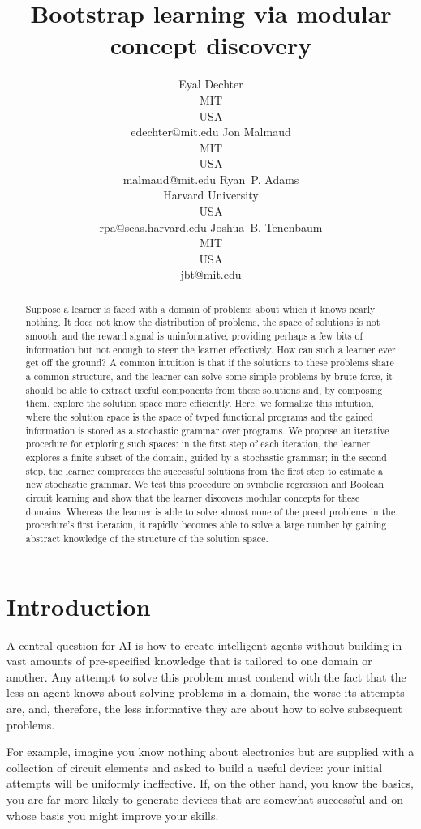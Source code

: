 \documentclass{article}
\title{Bootstrap learning via modular concept discovery}
\author{Eyal Dechter \\
MIT\\
USA \\
edechter@mit.edu
\And
Jon Malmaud \\
MIT \\ 
USA \\
malmaud@mit.edu
\And 
Ryan~P.  Adams \\
Harvard University\\
USA \\
rpa@seas.harvard.edu
\And
Joshua~B. Tenenbaum \\
MIT\\
USA \\
jbt@mit.edu
}
\begin{document}
\maketitle
\begin{abstract}
 Suppose a learner is faced with a domain of problems about which it
 knows nearly nothing. It does not know the distribution of problems,
 the space of solutions is not smooth, and the reward signal is
 uninformative, providing perhaps a few bits of information but not
 enough to steer the learner effectively. How can such a learner ever
 get off the ground? A common intuition is that if the solutions to
 these problems share a common structure, and the learner can solve
 some simple problems by brute force, it should be able to extract
 useful components from these solutions and, by composing them,
 explore the solution space more efficiently. Here, we formalize this
 intuition, where the solution space is the space of typed functional
 programs and the gained information is stored as a stochastic grammar
 over programs. We propose an iterative procedure for exploring such
 spaces: in the first step of each iteration, the learner explores a
 finite subset of the domain, guided by a stochastic grammar; in the
 second step, the learner compresses the successful solutions from the
 first step to estimate a new stochastic grammar. We test this
 procedure on symbolic regression and Boolean circuit learning and
 show that the learner discovers modular concepts for these
 domains. Whereas the learner is able to solve almost none of the
 posed problems in the procedure's first iteration, it rapidly becomes
 able to solve a large number by gaining abstract knowledge of the
 structure of the solution space.
 
 
\end{abstract}

\section{Introduction}
A central question for AI is how to create intelligent agents without
building in vast amounts of pre-specified knowledge that is tailored
to one domain or another. Any attempt to solve this problem must
contend with the fact that the less an agent knows about solving
problems in a domain, the worse its attempts are, and, therefore, the
less informative they are about how to solve subsequent problems. 

For example, imagine you know nothing about electronics but are
supplied with a collection of circuit elements and asked to build a
useful device: your initial attempts will be uniformly
ineffective. If, on the other hand, you know the basics, you are far
more likely to generate devices that are somewhat successful and on
whose basis you might improve your skills.
\end{document}
